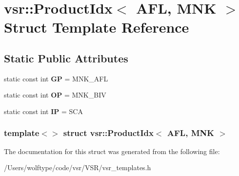 \hypertarget{structvsr_1_1_product_idx_3_01_a_f_l_00_01_m_n_k_01_4}{\section{vsr\-:\-:Product\-Idx$<$ A\-F\-L, M\-N\-K $>$ Struct Template Reference}
\label{structvsr_1_1_product_idx_3_01_a_f_l_00_01_m_n_k_01_4}
}
\subsection*{Static Public Attributes}
\begin{DoxyCompactItemize}
\item 
\hypertarget{structvsr_1_1_product_idx_3_01_a_f_l_00_01_m_n_k_01_4_a79bd0628058318df1e07bdb6a0be7abb}{static const int {\bfseries G\-P} = M\-N\-K\-\_\-\-A\-F\-L}\label{structvsr_1_1_product_idx_3_01_a_f_l_00_01_m_n_k_01_4_a79bd0628058318df1e07bdb6a0be7abb}

\item 
\hypertarget{structvsr_1_1_product_idx_3_01_a_f_l_00_01_m_n_k_01_4_a858682438a27686a90b13b14557be5e9}{static const int {\bfseries O\-P} = M\-N\-K\-\_\-\-B\-I\-V}\label{structvsr_1_1_product_idx_3_01_a_f_l_00_01_m_n_k_01_4_a858682438a27686a90b13b14557be5e9}

\item 
\hypertarget{structvsr_1_1_product_idx_3_01_a_f_l_00_01_m_n_k_01_4_ae8fc255ddac8476cce63b82e40774201}{static const int {\bfseries I\-P} = S\-C\-A}\label{structvsr_1_1_product_idx_3_01_a_f_l_00_01_m_n_k_01_4_ae8fc255ddac8476cce63b82e40774201}

\end{DoxyCompactItemize}
\subsubsection*{template$<$$>$ struct vsr\-::\-Product\-Idx$<$ A\-F\-L, M\-N\-K $>$}



The documentation for this struct was generated from the following file\-:\begin{DoxyCompactItemize}
\item 
/\-Users/wolftype/code/vsr/\-V\-S\-R/vsr\-\_\-templates.\-h\end{DoxyCompactItemize}
